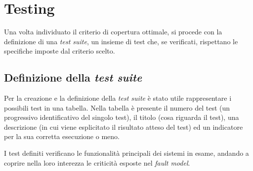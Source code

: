 \chapter{Testing}

Una volta individuato il criterio di copertura ottimale, si procede con la definizione di una \emph{test suite}, un insieme di test che, se verificati, rispettano le specifiche imposte dal criterio scelto.

\section{Definizione della \emph{test suite}}

Per la creazione e la definizione della \emph{test suite} è stato utile rappresentare i possibili test in una tabella. Nella tabella è presente il numero del test (un progressivo identificativo del singolo test), il titolo (cosa riguarda il test), una descrizione (in cui viene esplicitato il risultato atteso del test) ed un indicatore per la sua corretta esecuzione o meno.

I test definiti verificano le funzionalità principali dei sistemi in esame, andando a coprire nella loro interezza le criticità esposte nel \emph{fault model}.

